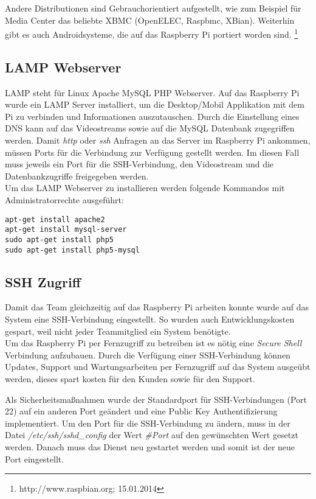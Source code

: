 Andere Distributionen sind Gebrauchorientiert aufgestellt, wie zum Beispiel für Media Center das beliebte XBMC (OpenELEC, Raspbmc, XBian). Weiterhin gibt es auch Androidsysteme, die auf das Raspberry Pi portiert worden sind.
\footnote{http://www.raspbian.org; 15.01.2014}


\subsection{LAMP Webserver}
LAMP steht für Linux Apache MySQL PHP Webserver. Auf das Raspberry Pi wurde ein LAMP Server installiert, um die Desktop/Mobil Applikation mit dem Pi zu verbinden und Informationen auszutauschen. Durch die Einstellung eines DNS kann auf das Videostreams sowie auf die MySQL Datenbank zugegriffen werden. Damit \textit{http} oder \textit{ssh} Anfragen  an das Server im Raspberry Pi ankommen, müssen Ports für die Verbindung zur Verfügung gestellt werden. Im diesen Fall muss jeweils ein Port für die SSH-Verbindung, den Videostream und die Datenbankzugriffe freigegeben werden.\\

Um das LAMP Webserver zu installieren werden folgende Kommandos mit Administratorrechte ausgeführt:\\
\begin{lstlisting}
apt-get install apache2
apt-get install mysql-server
sudo apt-get install php5
sudo apt-get install php5-mysql
\end{lstlisting}

\subsection{SSH Zugriff}
Damit das Team gleichzeitig auf das Raspberry Pi arbeiten konnte wurde auf das System eine SSH-Verbindung eingestellt. So wurden auch Entwicklungskosten gespart, weil nicht jeder Teammitglied ein System benötigte.\\

Um das Raspberry Pi per Fernzugriff zu betreiben ist es nötig eine \textit{Secure Shell} Verbindung aufzubauen. Durch die Verfügung einer SSH-Verbindung können Updates, Support und Wartungsarbeiten per Fernzugriff auf das System ausgeübt werden, dieses spart kosten für den Kunden sowie für den Support.

Als Sicherheitsmaßnahmen wurde der Standardport für SSH-Verbindungen (Port 22) auf ein anderen Port geändert und eine Public Key Authentifizierung implementiert. Um den Port für die SSH-Verbindung zu ändern, muss in der Datei \textit{/etc/ssh/sshd\_config} der Wert \textit{\#Port} auf den gewünschten Wert gesetzt werden. Danach muss das Dienst neu gestartet werden und somit ist der neue Port eingestellt.\\

